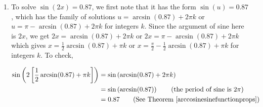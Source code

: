 {\begin{enumerate}
 To determine which of our answers lie in the interval $[0,2\pi)$, we first need to get an idea of the value of $2\arctan(-3)$.  While we could easily find an approximation using a calculator, we proceed analytically.  Since $-3 < 0$, it follows that $-\frac{\pi}{2} < \arctan(-3) < 0$.  Multiplying through by $2$ gives $-\pi < 2\arctan(-3) < 0$.   We are now in a position to argue which of the solutions $x = 2\arctan(-3) + 2\pi k$ lie in $[0,2\pi)$.  For $k = 0$, we get $x = 2\arctan(-3) < 0$, so we discard this answer and all answers $x = 2\arctan(-3) + 2\pi k$ where $k < 0$.  Next, we turn our attention to $k = 1$ and get $x = 2\arctan(-3) + 2\pi$. Starting with the inequality $-\pi < 2\arctan(-3) < 0$, we add $2\pi$  and get $\pi < 2\arctan(-3) +2\pi < 2\pi$.  This means $x = 2\arctan(-3) + 2\pi$ lies in $[0,2\pi)$.  Advancing $k$ to $2$ produces $x = 2\arctan(-3) + 4\pi$. Once again, we get from $-\pi < 2\arctan(-3) < 0$ that $3\pi < 2\arctan(-3) + 4\pi < 4\pi$.  Since this is outside the interval $[0,2\pi)$,  we discard $x = 2\arctan(-3) + 4\pi$ and all solutions of the form $x = 2\arctan(-3) + 2\pi k$ for $k > 2$.   Graphically, we see in Figure \ref{fig:trigeg1-5} that $y = \tan\left(\frac{x}{2}\right)$ and $y = -3$ intersect only once on $[0,2\pi)$ at $x = 2\arctan(-3) + 2\pi\approx 3.7851$.


\item To solve $\sin(2x) = 0.87$, we first note that it has the form $\sin(u) = 0.87$, which has the family of solutions $u = \arcsin(0.87) + 2\pi k$ or $u =\pi -  \arcsin(0.87) + 2\pi k$ for integers $k$. Since the argument of sine here is $2x$, we get $2x = \arcsin(0.87) + 2\pi k$ or $2x =\pi -  \arcsin(0.87) + 2\pi k$ which gives $x = \frac{1}{2} \arcsin(0.87) + \pi k$ or $x =\frac{\pi}{2} -  \frac{1}{2}\arcsin(0.87) + \pi k$ for integers $k$.  To check,

\begin{align*}
\sin\left(2\left[\frac{1}{2} \arcsin(0.87) + \pi k\right]\right)  &  =  \sin\left(\arcsin(0.87) + 2\pi k\right)   \\
		& =   \sin\left(\arcsin(0.87)\right)  \tag*{(the period of sine is $2\pi$)} \\
        & =   0.87 \tag*{(See Theorem \ref{arccosinesinefunctionprops})}
\end{align*}
        



\end{enumerate}}
